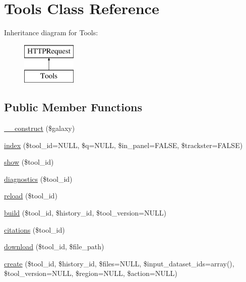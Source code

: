 \hypertarget{classTools}{}\section{Tools Class Reference}
\label{classTools}
Inheritance diagram for Tools\+:\begin{figure}[H]
\begin{center}
\leavevmode
\includegraphics[height=2.000000cm]{classTools}
\end{center}
\end{figure}
\subsection*{Public Member Functions}
\begin{DoxyCompactItemize}
\item 
\hyperlink{classTools_a6c92297b66e27e21e3b68e037870b61b}{\+\_\+\+\_\+construct} (\$galaxy)
\item 
\hyperlink{classTools_a1875c4619e668075faccf1a2f0cdd118}{index} (\$tool\+\_\+id=N\+U\+LL, \$q=N\+U\+LL, \$in\+\_\+panel=F\+A\+L\+SE, \$trackster=F\+A\+L\+SE)
\item 
\hyperlink{classTools_a4a86784cc0d4a366ba12e5ee736b6c0b}{show} (\$tool\+\_\+id)
\item 
\hyperlink{classTools_a6399f14dc2742734aac118c71896e77e}{diagnostics} (\$tool\+\_\+id)
\item 
\hyperlink{classTools_af681de7d892bf2b17d388d63534a45f9}{reload} (\$tool\+\_\+id)
\item 
\hyperlink{classTools_aa367ad2e9641a3e7cba7a48a1927de89}{build} (\$tool\+\_\+id, \$history\+\_\+id, \$tool\+\_\+version=N\+U\+LL)
\item 
\hyperlink{classTools_adf67dfe22f68133f3a7a68950b9f3ec9}{citations} (\$tool\+\_\+id)
\item 
\hyperlink{classTools_a355eb988d4bbd7f3b28b505e4c950d58}{download} (\$tool\+\_\+id, \$file\+\_\+path)
\item 
\hyperlink{classTools_a94a6d817eda85b60d90943049e50808f}{create} (\$tool\+\_\+id, \$history\+\_\+id, \$files=N\+U\+LL, \$input\+\_\+dataset\+\_\+ids=array(), \$tool\+\_\+version=N\+U\+LL, \$region=N\+U\+LL, \$action=N\+U\+LL)
\end{DoxyCompactItemize}
